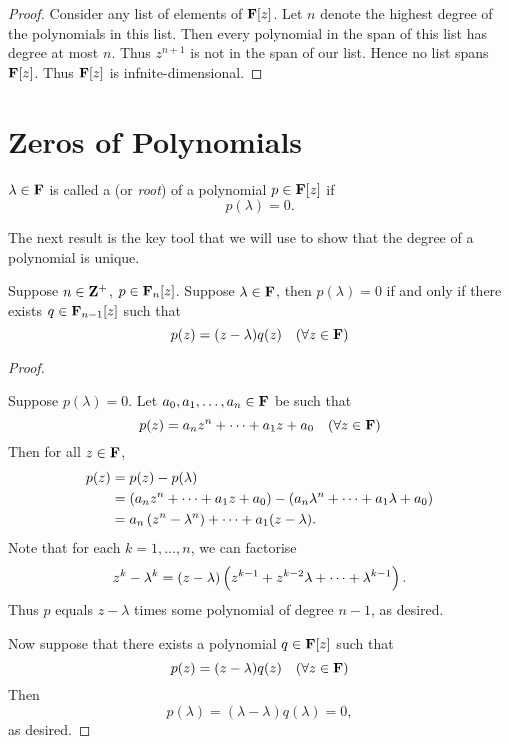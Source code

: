 \begin{proof}
Consider any list of elements of $\mathbf F[z]$. Let $n$ denote the highest degree of the polynomials in this list. Then every polynomial in the span of this list has degree at most $n$. Thus $z^{n+1}$ is not in the span of our list. Hence no list spans $\mathbf F[z]$. Thus $\mathbf F[z]$ is infnite-dimensional.
\end{proof}
\pagebreak

\section{Zeros of Polynomials}
\begin{definition}
$\lambda\in\mathbf F$ is called a  (or \emph{root}) of a polynomial $p\in\mathbf F[z]$ if
\[p(\lambda)=0.\]
\end{definition}

The next result is the key tool that we will use to show that the degree of a polynomial is unique.

\begin{lemma}\label{lemma:factor-thm}
Suppose $n\in\mathbf Z^+$, $p\in\mathbf F_n[z]$. Suppose $\lambda\in\mathbf F$, then $p(\lambda)=0$ if and only if there exists $q\in\mathbf F_{n-1}[z]$ such that
\[p(z)=(z-\lambda)q(z)\quad(\forall z\in\mathbf F)\]
\end{lemma}

\begin{proof} \

\fbox{$\implies$} Suppose $p(\lambda)=0$. Let $a_0,a_1,\dots,a_n\in\mathbf F$ be such that
\[p(z)=a_nz^n+\cdots+a_1z+a_0\quad(\forall z\in\mathbf F)\]
Then for all $z\in\mathbf F$,
\begin{align*}
p(z)&=p(z)-p(\lambda)\\
&=\left(a_nz^n+\cdots+a_1z+a_0\right)-\left(a_n\lambda^n+\cdots+a_1\lambda+a_0\right)\\
&=a_n\left(z^n-\lambda^n\right)+\cdots+a_1(z-\lambda).
\end{align*}
Note that for each $k=1,\dots,n$, we can factorise
\[z^k-\lambda^k=(z-\lambda)\left(z^{k-1}+z^{k-2}\lambda+\cdots+\lambda^{k-1}\right).\]
Thus $p$ equals $z-\lambda$ times some polynomial of degree $n-1$, as desired.

\fbox{$\impliedby$} Now suppose that there exists a polynomial $q\in\mathbf F[z]$ such that
\[p(z)=(z-\lambda)q(z)\quad(\forall z\in\mathbf F)\]
Then
\[p(\lambda)=(\lambda-\lambda)q(\lambda)=0,\]
as desired.
\end{proof}

